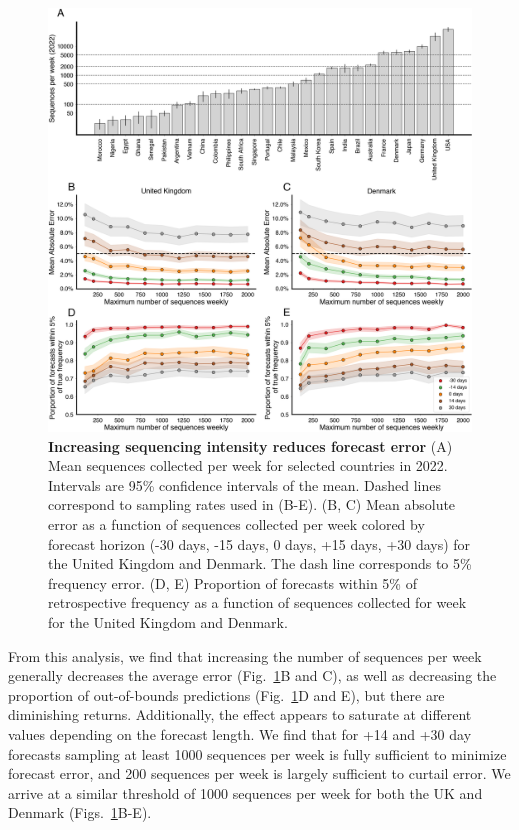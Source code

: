 \begin{figure}[tb!]
    \centering
    \includegraphics[width=1.0\linewidth]{figures/downscaling_sequencing.png}
    \caption[\textbf{Increasing sequencing intensity reduces forecast error}]{
	\textbf{Increasing sequencing intensity reduces forecast error}
    	(A) Mean sequences collected per week for selected countries in 2022.
			Intervals are 95\% confidence intervals of the mean.
			Dashed lines correspond to sampling rates used in (B-E).
    	(B, C) Mean absolute error as a function of sequences collected per week colored by forecast horizon (-30 days, -15 days, 0 days, +15 days, +30 days) for the United Kingdom and Denmark.
			The dash line corresponds to 5\% frequency error.
    	(D, E) Proportion of forecasts within 5\% of retrospective frequency as a function of sequences collected for week for the United Kingdom and Denmark.
  	}
    \label{fig:Fig6}
\end{figure}


From this analysis, we find that increasing the number of sequences per week generally decreases the average error (Fig.~\ref{fig:Fig6}B and C), as well as decreasing the proportion of out-of-bounds predictions (Fig.~\ref{fig:Fig6}D and E), but there are diminishing returns.
Additionally, the effect appears to saturate at different values depending on the forecast length.
We find that for +14 and +30 day forecasts sampling at least 1000 sequences per week is fully sufficient to minimize forecast error, and 200 sequences per week is largely sufficient to curtail error.
We arrive at a similar threshold of 1000 sequences per week for both the UK and Denmark (Figs.~\ref{fig:Fig6}B-E).


